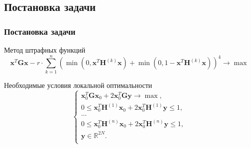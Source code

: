 \subsection{Постановка задачи}
\begin{frame}
    \frametitle{Постановка задачи}
    \begin{block}{Метод штрафных функций}
        \begin{equation}
               \textbf{x}^{T}\textbf{Gx} - r\cdot \sum_{k=1}^n
               \left( \min\left(0,\textbf{x}^{T}\textbf{H}^{(k)}\textbf{x}\right) +
               \min\left(0,1-\textbf{x}^{T}\textbf{H}^{(k)}\textbf{x}\right)\right)^4 \rightarrow
               \max
             \label{eq:task4}
        \end{equation}
    \end{block}

    \begin{block}{Необходимые условия локальной оптимальности}
        \begin{equation}
            \begin{cases}
               \textbf{x}_0^T\textbf{G}\textbf{x}_0 + 2\textbf{x}_0^T\textbf{G}\textbf{y} \rightarrow \max,\\
               0 \leq \textbf{x}_0^T\textbf{H}^{(1)}\textbf{x}_0 + 2\textbf{x}_0^T\textbf{H}^{(1)}\textbf{y} \leq 1,\\
               ...\\
               0 \leq \textbf{x}_0^T\textbf{H}^{(n)}\textbf{x}_0 + 2\textbf{x}_0^T\textbf{H}^{(n)}\textbf{y} \leq 1,\\
              \textbf{y} \in \mathbb{R}^{2N}.\\
             \end{cases}
             \label{eq:task5}
        \end{equation}
    \end{block}
\end{frame}

